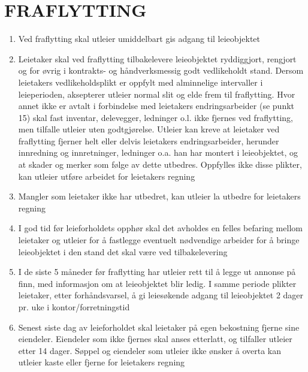 \section{FRAFLYTTING}


    \begin{enumerate}

        \item Ved fraflytting skal utleier umiddelbart gis adgang til leieobjektet

        \item Leietaker skal ved fraflytting tilbakelevere leieobjektet ryddiggjort, rengjort og
        for øvrig i kontrakts- og håndverksmessig godt vedlikeholdt stand.
        Dersom leietakers vedlikeholdsplikt er oppfylt med alminnelige intervaller i leieperioden,
        aksepterer utleier normal slit og elde frem til fraflytting. Hvor annet ikke er avtalt i forbindelse med
        leietakers endringsarbeider (se punkt 15) skal fast inventar, delevegger, ledninger o.l. ikke fjernes ved
        fraflytting, men tilfalle utleier uten godtgjørelse. Utleier kan kreve at leietaker ved fraflytting fjerner helt
        eller delvis leietakers endringsarbeider, herunder innredning og innretninger, ledninger o.a. han har
        montert i leieobjektet, og at skader og merker som følge av dette utbedres. Oppfylles ikke disse plikter,
        kan utleier utføre arbeidet for leietakers regning

        \item Mangler som leietaker ikke har utbedret, kan utleier la utbedre for leietakers regning

        \item I god tid før leieforholdets opphør skal det avholdes en felles befaring mellom leietaker og utleier for å
        fastlegge eventuelt nødvendige arbeider for å bringe leieobjektet i den stand det skal være ved
        tilbakelevering

        \item I de siste 5 måneder før fraflytting har utleier rett til å legge ut annonse på finn, med informasjon om
        at leieobjektet blir ledig. I samme periode plikter leietaker, etter forhåndsvarsel, å gi leiesøkende adgang
        til leieobjektet 2 dager pr. uke i kontor/forretningstid

        \item Senest siste dag av leieforholdet skal leietaker på egen bekostning fjerne sine eiendeler. Eiendeler som
        ikke fjernes skal anses etterlatt, og tilfaller utleier etter 14 dager. Søppel og eiendeler som utleier ikke
        ønsker å overta kan utleier kaste eller fjerne for leietakers regning


    \end{enumerate}
